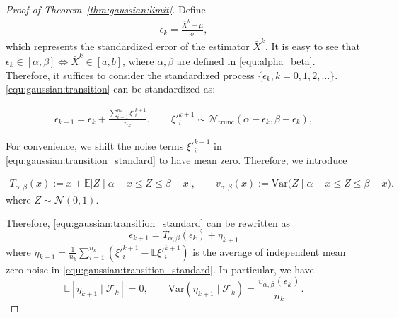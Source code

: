 \begin{proof}[Proof of Theorem~\ref{thm:gaussian:limit}]
Define
\begin{align}
    \epsilon_k = \frac{\bar{X}^k - \mu}{\sigma}\label{equ:def_epsilon},
\end{align}
which represents the standardized error of the estimator $\bar{X}^k$.
It is easy to see that $\epsilon_k \in [\alpha,\beta] \Leftrightarrow \bar{X}^k \in [a,b]$, where $\alpha,\beta$ are defined in \eqref{equ:alpha_beta}.
Therefore, it suffices to consider the standardized process $\{\epsilon_k,k=0,1,2,\ldots\}$.
\eqref{equ:gaussian:transition} can be standardized as:

\begin{align}
     \epsilon_{k+1}  = \epsilon_{k} + \frac{\sum_{i=1}^{n_k}\xi'^{k+1}_i}{n_k}, \qquad \xi'^{k+1}_i \sim \mathcal{N}_{\text{trunc}}\left(\alpha - \epsilon_k,\beta - \epsilon_k \right)\label{equ:gaussian:transition_standard},
\end{align}

For convenience, we shift the noise terms $\xi'^{k+1}_i$ in \eqref{equ:gaussian:transition_standard} to have mean zero. Therefore, we introduce

\begin{align}\label{equ:gaussian:Tv_def}
T_{\alpha,\beta}(x):=x+\mathbb{E}\!\big[Z\;\big|\;\alpha-x\le Z\le \beta-x\big],\qquad
v_{\alpha,\beta}(x):= \mathrm{Var}\!\big(Z\;\big|\;\alpha-x\le Z \le\beta-x\big).
\end{align}
where $Z\sim\mathcal{N}(0,1)$.

Therefore, \eqref{equ:gaussian:transition_standard} can be rewritten as
\begin{equation}\label{equ:gaussian:contraction}
\epsilon_{k+1}=T_{\alpha,\beta}(\epsilon_k)+\eta_{k+1}
\end{equation}
where $\eta_{k+1} = \frac{1}{n_k}\sum_{i=1}^{n_k}\left(\xi'^{k+1}_i - \mathbb{E}\xi'^{k+1}_i\right)$ is the average of independent mean zero noise in \eqref{equ:gaussian:transition_standard}. In particular, we have
\[
\mathbb{E}[\eta_{k+1} \mid \mathcal{F}_k] = 0,\qquad
\mathrm{Var}(\eta_{k+1} \mid \mathcal{F}_k) = \frac{v_{\alpha,\beta}(\epsilon_k)}{n_k}.
\]


\end{proof}

